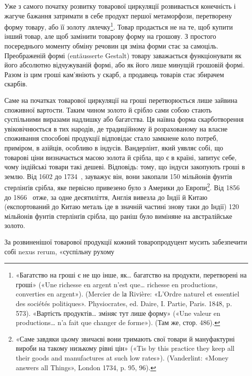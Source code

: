 Уже з самого початку розвитку товарової циркуляції розвивається
конечність і жагуче бажання затримати в себе продукт
першої метаморфози, перетворену форму товару, або її золоту
лялечку\footnote{
«Багатство на гроші є не що інше, як\dots{} багатство на продукти,
перетворені на гроші» («Une richesse en argent n’est que\dots{} richesse en
productions, converties en argent»). (Mercier de lа Rivière: «L’Ordre naturel
et essentiel des sociétés politiques». Physiocrates, ed. Daire, I. Partie, Paris.
1848, p. 573). «Вартість продуктів\dots{} зміняє тут лише форму» («Une valeur
en productions\dots{} n’a fait que changer de forme»). (Там же, стор. 486).
}. Товар продається не на те, щоб купити інший товар,
але щоб замінити товарову форму на грошову. З простого посереднього
моменту обміну речовин ця зміна форми стає за самоціль.
Преображеній формі (entäusserte Gestalt) товару заважається
функціонувати як його абсолютно відчужуваній формі,
або як його лише минущій грошовій формі. Разом із цим гроші
кам’яніють у скарб, а продавець товарів стає збирачем скарбів.

Саме на початках товарової циркуляції на гроші перетворюється
лише зайвина споживної вартости. Таким чином золото
й срібло сами собою стають суспільними виразами надлишку або
багатства. Ця наївна форма скарботворення увіковічнюється в
тих народів, де традиційному й розрахованому на власне споживання
способові продукції відповідає стало замкнене коло потреб,
приміром, в азійців, особливо в індусів. Вандерлінт, який уявляє
собі, що товарові ціни визначається масою золота й срібла, що
є в країні, запитує себе, чому індійські товари такі дешеві.
Відповідь: тому, що індуси закопують гроші в землю. Від 1602
до 1734~, зауважує він, вони закопали 150 мільйонів фунтів
стерлінґів срібла, яке первісно привезено було з Америки до
Европи\footnote{
«Саме завдяки цьому звичаєві вони тримають свої товари й мануфактурні
вироби на такому низькому рівні цін» («Tis by this practice
they keep all their goods and manufactures at such low rates»). (Vanderlint:
«Money answers all Things», London 1734, p. 95, 96).
}. Від 1856 до 1866~ отже, за одне десятиліття, Англія
вивезла до Індії й Китаю (експортований до Китаю металь іде в
значній частині знову таки до Індії) 120 мільйонів фунтів стерлінґів
срібла, що раніш було виміняне на австралійське золото.

За розвиненішої товарової продукції кожний товаропродуцент
мусить забезпечити собі nexus rerum, «суспільну рухому
\parbreak{}  %
